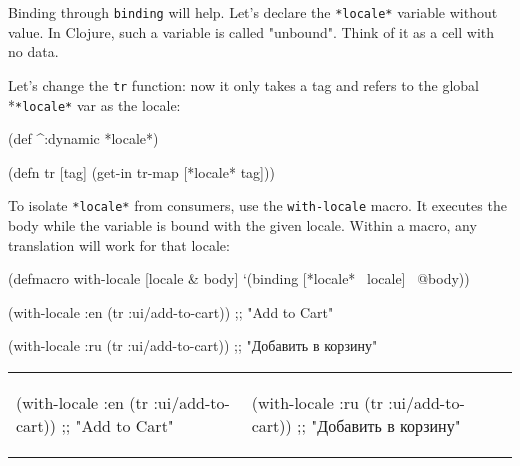 Binding through \verb|binding| will help.
Let's declare the \verb|*locale*| variable without value. In Clojure, such a variable is called "unbound".
Think of it as a cell with no data.

Let's change the \verb|tr| function: now it only takes a tag and refers to the global *\verb|*locale*| var as the locale:

\begin{english}
  \begin{clojure}
(def ^:dynamic *locale*)

(defn tr [tag]
  (get-in tr-map [*locale* tag]))
  \end{clojure}
\end{english}


To isolate \verb|*locale*| from consumers, use the \verb|with-locale| macro.
It executes the body while the variable is bound with the given locale.
Within a macro, any translation will work for that locale:

\begin{english}
  \begin{clojure}
(defmacro with-locale
  [locale & body]
  `(binding [*locale* ~locale]
     ~@body))
  \end{clojure}
\end{english}

\ifx\DEVICETYPE\MOBILE

\begin{clojure}
(with-locale :en
  (tr :ui/add-to-cart))
;; "Add to Cart"
\end{clojure}

\splitter

\begin{clojure}
(with-locale :ru
  (tr :ui/add-to-cart))
;; "Добавить в корзину"
\end{clojure}

\else


\noindent
\begin{tabular}{ @{}p{5cm} @{}p{5cm} }

  \begin{clojure}
(with-locale :en
  (tr :ui/add-to-cart))
;; "Add to Cart"
  \end{clojure}

&

  \begin{clojure}
(with-locale :ru
  (tr :ui/add-to-cart))
;; "Добавить в корзину"
  \end{clojure}

\end{tabular}

